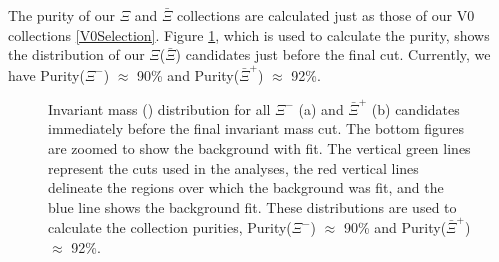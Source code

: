 \documentclass[../AnalysisNoteJBuxton.tex]{subfiles}
\begin{document}
The purity of our $\Xi$ and $\bar{\Xi}$ collections are calculated just as those of our V0 collections \ref{V0Selection}.
Figure \ref{fig:XiPurity}, which is used to calculate the purity, shows the \minv distribution of our $\Xi$($\bar{\Xi}$) candidates just before the final \minv cut.  Currently, we have Purity($\Xi^{-}$) $\approx$ 90\% and Purity($\bar{\Xi}^{+}$) $\approx$ 92\%.

\begin{figure}[h!]
  \centering
  \caption[$\Xi^{-}$($\bar{\Xi}^{+}$) Purity]{Invariant mass (\minv) distribution for all $\Xi^{-}$ (a) and $\bar{\Xi}^{+}$ (b) candidates immediately before the final invariant mass cut.  The bottom figures are zoomed to show the background with fit.  The vertical green lines represent the \minv cuts used in the analyses, the red vertical lines delineate the regions over which the background was fit, and the blue line shows the background fit.  These distributions are used to calculate the collection purities, Purity($\Xi^{-}$) $\approx$ 90\% and Purity($\bar{\Xi}^{+}$) $\approx$ 92\%.}
  \label{fig:XiPurity}
\end{figure}
\end{document}
